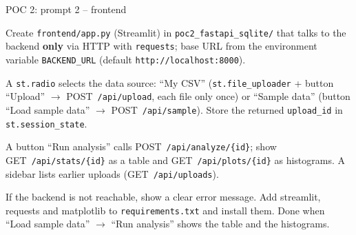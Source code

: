 \documentclass[aspectratio=169,11pt]{beamer}
\begin{document}
\begin{frame}{POC 2: prompt 2 -- frontend}
  \vspace{2pt}
  \begin{promptbox}
    Create \texttt{frontend/app.py} (Streamlit) in \texttt{poc2\_fastapi\_sqlite/} that talks to the backend \textbf{only} via HTTP with \texttt{requests}; base URL from the environment variable \texttt{BACKEND\_URL} (default \texttt{http://localhost:8000}).
    \par\smallskip
    A \texttt{st.radio} selects the data source: ``My CSV'' (\texttt{st.file\_uploader} + button ``Upload'' $\rightarrow$ POST~\texttt{/api/upload}, each file only once) or ``Sample data'' (button ``Load sample data'' $\rightarrow$ POST~\texttt{/api/sample}). Store the returned \texttt{upload\_id} in \texttt{st.session\_state}.
    \par\smallskip
    A button ``Run analysis'' calls POST~\texttt{/api/analyze/\{id\}}; show GET~\texttt{/api/stats/\{id\}} as a table and GET~\texttt{/api/plots/\{id\}} as histograms. A sidebar lists earlier uploads (GET~\texttt{/api/uploads}).
    \par\smallskip
    If the backend is not reachable, show a clear error message. Add streamlit, requests and matplotlib to \texttt{requirements.txt} and install them. Done when ``Load sample data'' $\rightarrow$ ``Run analysis'' shows the table and the histograms.
  \end{promptbox}
\end{frame}
\end{document}
